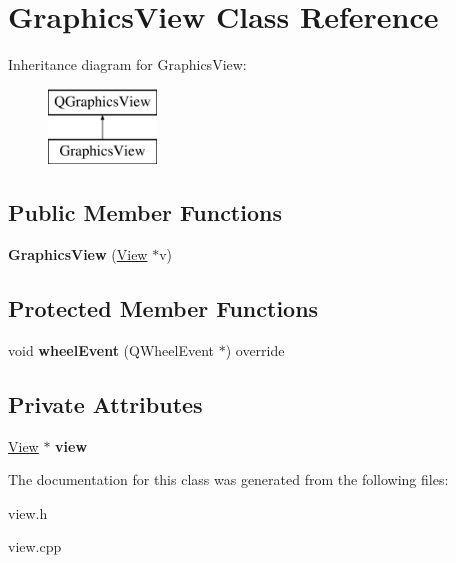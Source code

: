\hypertarget{class_graphics_view}{}\section{Graphics\+View Class Reference}
\label{class_graphics_view}
Inheritance diagram for Graphics\+View\+:\begin{figure}[H]
\begin{center}
\leavevmode
\includegraphics[height=2.000000cm]{class_graphics_view}
\end{center}
\end{figure}
\subsection*{Public Member Functions}
\begin{DoxyCompactItemize}
\item 
\mbox{\label{class_graphics_view_ae51829556129352fa50cfc73c44ec345}} 
{\bfseries Graphics\+View} (\hyperlink{class_view}{View} $\ast$v)
\end{DoxyCompactItemize}
\subsection*{Protected Member Functions}
\begin{DoxyCompactItemize}
\item 
\mbox{\label{class_graphics_view_a49031234f9ceb0536dd03e76672ad071}} 
void {\bfseries wheel\+Event} (Q\+Wheel\+Event $\ast$) override
\end{DoxyCompactItemize}
\subsection*{Private Attributes}
\begin{DoxyCompactItemize}
\item 
\mbox{\label{class_graphics_view_a6b93cb693f5fbb789943a8b50a32d6f6}} 
\hyperlink{class_view}{View} $\ast$ {\bfseries view}
\end{DoxyCompactItemize}


The documentation for this class was generated from the following files\+:\begin{DoxyCompactItemize}
\item 
view.\+h\item 
view.\+cpp\end{DoxyCompactItemize}

